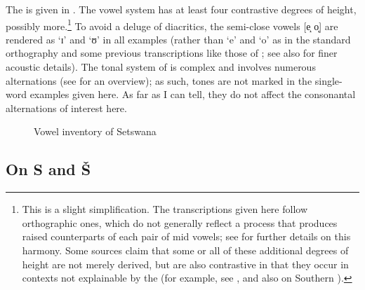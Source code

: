 The  is given in  \citep{Bennett2016}. The vowel system has at least four contrastive degrees of height, possibly more.\footnote{This is a slight simplification. The transcriptions given here follow  orthographic ones, which do not generally reflect a  process that produces raised counterparts of each pair of mid vowels; see \citet{Dichabe1997} for further details on this harmony. Some sources claim that some or all of these additional degrees of height are not merely derived, but are also contrastive in that they occur in contexts not explainable by the  (for example, see \citealt{chebanneetal1997,Creissels2005emergence}, and also \citealt{Khabanyane1991} on Southern ).} To avoid a deluge of diacritics, the semi-close vowels [e̝ o̝] are rendered as ‘ɪ’ and ‘ʊ’ in all examples (rather than ‘e’ and ‘o’ as in the standard orthography and some previous transcriptions like those of \citealt{Cole1955}; see also \citealt{Roux2008} for finer acoustic details). The tonal system of  is complex and involves numerous alternations (see \citealt{chebanneetal1997} for an overview); as such, tones are not marked in the single-word examples given here. As far as I can tell, they do not affect the consonantal alternations of interest here.

   
\begin{figure}
\begin{vowel}
\end{vowel}
\caption{Vowel inventory of Setswana \citep{BennettEtAl2016}}
\label{fig:bennett:1}
\end{figure} 

\subsection{On S and Š}\label{sec:bennett:2.2}

